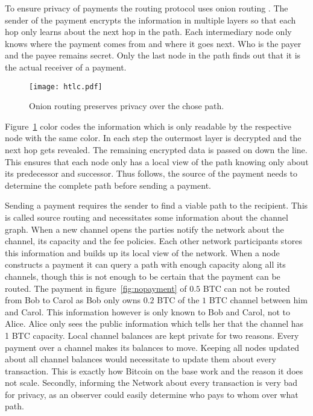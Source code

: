 \documentclass[final]{fhnwreport}       %
\begin{document}
To ensure privacy of payments the routing protocol uses onion routing . The sender of the payment encrypts the information in multiple layers so that each hop only learns about the next hop in the path. Each intermediary node only knows where the payment comes from and where it goes next. Who is the payer and the payee remains secret. Only the last node in the path finds out that it is the actual receiver of a payment.

\begin{figure}[H]
\centering
\texttt{[image: htlc.pdf]}
\caption{Onion routing preserves privacy over the chose path.}
\label{fig:onion}
\end{figure}

Figure~\ref{fig:onion} color codes the information which is only readable by the respective node with the same color. In each step the outermost layer is decrypted and the next hop gets revealed. The remaining encrypted data is passed on down the line. This ensures that each node only has a local view of the path knowing only about its predecessor and successor. Thus follows, the source of the payment needs to determine the complete path before sending a payment.

Sending a payment requires the sender to find a viable path to the recipient. This is called source routing  and necessitates some information about the channel graph. When a new channel opens the parties notify the network about the channel, its capacity and the fee policies. Each other network participants stores this information and builds up its local view of the network. When a node constructs a payment it can query a path with enough capacity along all its channels, though this is not enough to be certain that the payment can be routed. The payment in figure~\ref{fig:nopayment} of $0.5$ BTC can not be routed from Bob to Carol as Bob only owns $0.2$ BTC of the $1$ BTC channel between him and Carol. This information however is only known to Bob and Carol, not to Alice. Alice only sees the public information which tells her that the channel has 1 BTC capacity. Local channel balances are kept private for two reasons. Every payment over a channel makes its balances to move. Keeping all nodes updated about all channel balances would necessitate to update them about every transaction. This is exactly how Bitcoin on the \gls{base} work and the reason it does not scale. Secondly, informing the Network about every transaction is very bad for privacy, as an observer could easily determine who pays to whom over what path.
\end{document}
